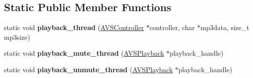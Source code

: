 \subsection*{Static Public Member Functions}
\begin{DoxyCompactItemize}
\item 
\mbox{\label{classAVSController_a00967eb8be7b2d3764acd1cb669ef775}} 
static void {\bfseries playback\+\_\+thread} (\hyperlink{classAVSController}{A\+V\+S\+Controller} $\ast$controller, char $\ast$mp3data, size\+\_\+t mp3size)
\item 
\mbox{\label{classAVSController_a6e5a0581df44aa4500d3ac7601e98494}} 
static void {\bfseries playback\+\_\+mute\+\_\+thread} (\hyperlink{classAVSPlayback}{A\+V\+S\+Playback} $\ast$playback\+\_\+handle)
\item 
\mbox{\label{classAVSController_ad6d9344629573dba5b0de01c1c9c56c8}} 
static void {\bfseries playback\+\_\+unmute\+\_\+thread} (\hyperlink{classAVSPlayback}{A\+V\+S\+Playback} $\ast$playback\+\_\+handle)
\end{DoxyCompactItemize}
